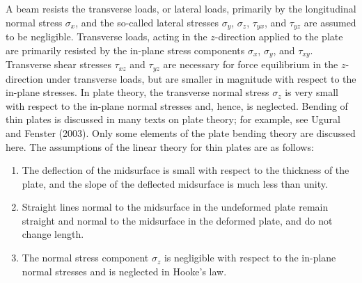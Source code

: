 \documentclass{AeroStructure-ERJohnson}
\begin{document}
A beam resists the transverse loads, or lateral loads, primarily by the longitudinal normal stress $\sigma_{{x}}$, and the so-called lateral stresses $\sigma_{{y}}$, $\sigma_{{z}}$, $\tau_{{yx}}$, and $\tau_{{yz}}$ are assumed to be negligible. Transverse loads, acting in\vadjust{\vspace*{8pt}\pagebreak} the $z$-direction applied to the plate are primarily resisted by the in-plane stress components $\sigma_{{x}}$, $\sigma_{{y}}$, and $\tau_{{xy}}$. Transverse shear stresses $\tau_{{xz}}$ and $\tau_{{yz}}$ are necessary for force equilibrium in the $z$-direction under transverse loads, but are smaller in magnitude with respect to the in-plane stresses. In plate theory, the transverse normal stress $\sigma_{{z}}$ is very small with respect to the in-plane normal stresses and, hence, is neglected. Bending of thin plates is discussed in many texts on plate theory; for example, see Ugural and Fenster (2003). Only some elements of the plate bending theory are discussed here. The assumptions of the linear theory for thin plates are as follows:
\begin{enumerate}
\item The deflection of the midsurface is small with respect to the thickness of the plate, and the slope of the deflected midsurface is much less than unity.
\item Straight lines normal to the midsurface in the undeformed plate remain straight and normal to the midsurface in the deformed plate, and do not change length.
\item The normal stress component $\sigma_{{z}}$ is negligible with respect to the in-plane normal stresses and is neglected in Hooke's law.
\end{enumerate}
\end{document}
